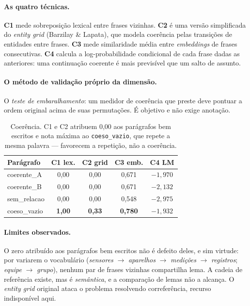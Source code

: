 \documentclass[11pt,a4paper]{article}
\newcommand{\dimtable}[1]{\small #1}
\begin{document}
\paragraph{As quatro técnicas.} \textbf{C1} mede sobreposição lexical entre frases vizinhas.
\textbf{C2} é uma versão simplificada do \textit{entity grid} (Barzilay \& Lapata), que modela
coerência pelas transições de entidades entre frases. \textbf{C3} mede similaridade média entre
\textit{embeddings} de frases consecutivas. \textbf{C4} calcula a log-probabilidade condicional de
cada frase dadas as anteriores: uma continuação coerente é mais previsível que um salto de assunto.

\paragraph{O método de validação próprio da dimensão.} O \emph{teste de embaralhamento}: um medidor
de coerência que preste deve pontuar a ordem original acima de suas permutações. É objetivo e não
exige anotação.

\begin{table}[H]
\centering
\dimtable{
\begin{tabular}{@{}lcccc@{}}
\toprule
\textbf{Parágrafo} & \textbf{C1 lex.} & \textbf{C2 grid} & \textbf{C3 emb.} & \textbf{C4 LM} \\
\midrule
coerente\_A  & 0{,}00 & 0{,}00 & 0{,}671 & $-1{,}970$ \\
coerente\_B  & 0{,}00 & 0{,}00 & 0{,}671 & $-2{,}132$ \\
sem\_relacao & 0{,}00 & 0{,}00 & 0{,}548 & $-2{,}975$ \\
coeso\_vazio & \textbf{1{,}00} & \textbf{0{,}33} & \textbf{0{,}780} & $-1{,}932$ \\
\bottomrule
\end{tabular}}
\caption{Coerência. C1 e C2 atribuem 0,00 aos parágrafos bem escritos e nota máxima ao
\texttt{coeso\_vazio}, que repete a mesma palavra --- favorecem a repetição, não a coerência.}
\label{tab:coerencia}
\end{table}

\paragraph{Limites observados.} O zero atribuído aos parágrafos bem escritos não é defeito deles, e
sim virtude: por variarem o vocabulário (\emph{sensores} $\rightarrow$ \emph{aparelhos}
$\rightarrow$ \emph{medições} $\rightarrow$ \emph{registros}; \emph{equipe} $\rightarrow$
\emph{grupo}), nenhum par de frases vizinhas compartilha lema. A cadeia de referência existe, mas é
\emph{semântica}, e a comparação de lemas não a alcança. O \textit{entity grid} original ataca o
problema resolvendo correferência, recurso indisponível aqui.
\end{document}
